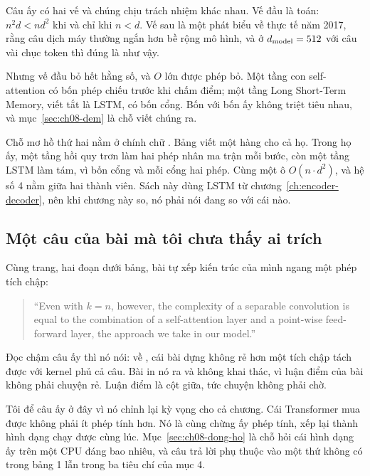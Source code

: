 Câu ấy có hai vế và chúng chịu trách nhiệm khác nhau. Vế đầu là toán:
\(n^2 d < n d^2\) khi và chỉ khi \(n < d\). Vế sau là một phát biểu về thực tế
năm 2017, rằng câu dịch máy thường ngắn hơn bề rộng mô hình, và ở
\(d_{\mathrm{model}} = 512\) với câu vài chục token thì đúng là như vậy.

Nhưng vế đầu bỏ hết hằng số, và \(O\) lớn được phép bỏ. Một tầng con
self-attention có bốn phép chiếu trước khi chấm điểm; một tầng Long Short-Term
Memory, viết tắt là LSTM, có bốn cổng.
Bốn với bốn ấy không triệt tiêu nhau, và mục~\ref{sec:ch08-dem} là chỗ viết
chúng ra.

%
Chỗ mơ hồ thứ hai nằm ở chính chữ . Bảng viết một hàng cho cả
họ. Trong họ ấy, một tầng hồi quy trơn làm hai phép nhân ma trận mỗi bước, còn
một tầng LSTM làm tám, vì bốn cổng và mỗi cổng hai phép. Cùng một ô \(O(n
\cdot d^2)\), và hệ số 4 nằm giữa hai thành viên. Sách này dùng LSTM từ
chương~\ref{ch:encoder-decoder}, nên khi chương này so, nó phải nói đang so với
cái nào.

\subsection*{Một câu của bài mà tôi chưa thấy ai trích}

%
Cùng trang, hai đoạn dưới bảng, bài tự xếp kiến trúc của mình ngang một phép
tích chập:

\begin{quote}
\enquote{Even with \(k = n\), however, the complexity of a separable convolution
is equal to the combination of a self-attention layer and a point-wise
feed-forward layer, the approach we take in our model.}
\end{quote}

Đọc chậm câu ấy thì nó nói: về , cái bài dựng không
rẻ hơn một tích
chập tách được với kernel phủ cả câu. Bài in nó ra và không khai thác, vì luận
điểm của bài không phải chuyện rẻ. Luận điểm là cột giữa, tức chuyện không phải
chờ.

Tôi để câu ấy ở đây vì nó chỉnh lại kỳ vọng cho cả chương. Cái Transformer mua
được không phải ít phép tính hơn. Nó là cùng chừng ấy phép tính, xếp lại thành
hình dạng chạy được cùng lúc. Mục~\ref{sec:ch08-dong-ho} là chỗ hỏi cái hình
dạng ấy trên một CPU đáng bao nhiêu, và câu trả lời phụ thuộc vào một thứ không
có trong bảng 1 lẫn trong ba tiêu chí của mục 4.
